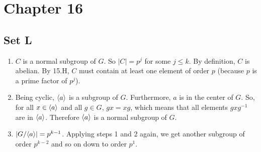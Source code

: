\section{Chapter 16}
\subsection{Set L}
\begin{enumerate}
    \item $C$ is a normal subgroup of $G$. So $|C| = p^j$ for some $j \leqslant k$. By definition, $C$ is abelian. By 15.H, $C$ must contain at least one element of order $p$ (because $p$ is a prime factor of $p^j$).
    \item Being cyclic, $\langle a\rangle$ is a subgroup of $G$. Furthermore, $a$ is in the center of $G$. So, for all $x \in \langle a\rangle$ and all $g \in G$, $gx = xg$, which means that all elements $gxg^{-1}$ are in $\langle a\rangle$.  Therefore $\langle a\rangle$ is a normal subgroup of $G$.
    \item $|G/\langle a\rangle| = p^{k - 1}$. Applying steps 1 and 2 again, we get another subgroup of order $p^{k - 2}$ and so on down to order $p^1$.
\end{enumerate}